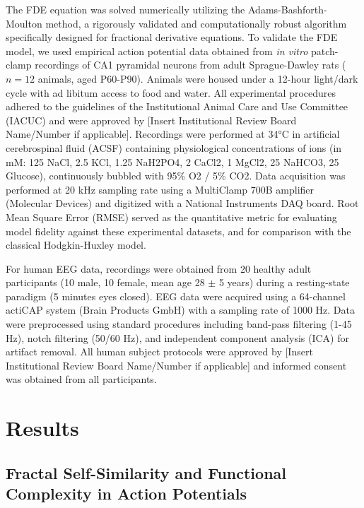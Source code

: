 \documentclass{article}
\begin{document}
The FDE equation was solved numerically utilizing the Adams-Bashforth-Moulton method, a rigorously validated and computationally robust algorithm specifically designed for fractional derivative equations. To validate the FDE model, we used empirical action potential data obtained from \textit{in vitro} patch-clamp recordings of CA1 pyramidal neurons from adult Sprague-Dawley rats ($n=12$ animals, aged P60-P90). Animals were housed under a 12-hour light/dark cycle with ad libitum access to food and water. All experimental procedures adhered to the guidelines of the Institutional Animal Care and Use Committee (IACUC) and were approved by [Insert Institutional Review Board Name/Number if applicable]. Recordings were performed at 34°C in artificial cerebrospinal fluid (ACSF) containing physiological concentrations of ions (in mM: 125 NaCl, 2.5 KCl, 1.25 NaH2PO4, 2 CaCl2, 1 MgCl2, 25 NaHCO3, 25 Glucose), continuously bubbled with 95\% O2 / 5\% CO2. Data acquisition was performed at 20 kHz sampling rate using a MultiClamp 700B amplifier (Molecular Devices) and digitized with a National Instruments DAQ board. Root Mean Square Error (RMSE) served as the quantitative metric for evaluating model fidelity against these experimental datasets, and for comparison with the classical Hodgkin-Huxley model.

For human EEG data, recordings were obtained from 20 healthy adult participants (10 male, 10 female, mean age 28 $\pm$ 5 years) during a resting-state paradigm (5 minutes eyes closed). EEG data were acquired using a 64-channel actiCAP system (Brain Products GmbH) with a sampling rate of 1000 Hz. Data were preprocessed using standard procedures including band-pass filtering (1-45 Hz), notch filtering (50/60 Hz), and independent component analysis (ICA) for artifact removal. All human subject protocols were approved by [Insert Institutional Review Board Name/Number if applicable] and informed consent was obtained from all participants.

\section{Results}

\subsection{Fractal Self-Similarity and Functional Complexity in Action Potentials}
\end{document}
